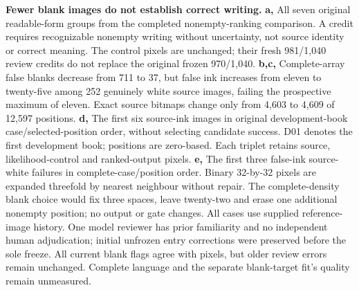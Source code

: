 \textbf{Fewer blank images do not establish correct writing.}
\textbf{a,} All seven original readable-form groups from the completed
nonempty-ranking comparison. A credit requires recognizable nonempty writing
without uncertainty, not source identity or correct meaning. The control
pixels are unchanged; their fresh 981/1,040 review credits do not replace the
original frozen 970/1,040. \textbf{b,c,} Complete-array false blanks decrease
from 711 to 37, but false ink increases from eleven to twenty-five among 252
genuinely white source images, failing the prospective maximum of eleven.
Exact source bitmaps change only from 4,603 to 4,609 of 12,597 positions.
\textbf{d,} The first six source-ink images in original development-book
case/selected-position order, without selecting candidate success. D01 denotes
the first development book; positions are zero-based. Each triplet retains
source, likelihood-control and ranked-output pixels. \textbf{e,} The first
three false-ink source-white failures in complete-case/position order.
Binary 32-by-32 pixels are expanded threefold by nearest neighbour without
repair. The complete-density blank choice would fix three spaces, leave
twenty-two and erase one additional nonempty position; no output or gate changes.
All cases use supplied reference-image history. One model reviewer has prior
familiarity and no independent human adjudication; initial unfrozen entry
corrections were preserved before the sole freeze. All current blank flags
agree with pixels, but older review errors remain unchanged. Complete language
and the separate blank-target fit's quality remain unmeasured.
